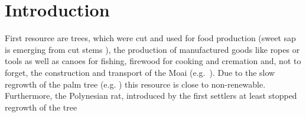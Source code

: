 
\section{Introduction}


First resource are trees, which were cut and used for food production (sweet sap is emerging from cut stems \citet{Mieth2015}), the production of manufactured goods like ropes or tools as well as canoes for fishing, firewood for cooking and cremation and, not to forget, the construction and transport of the Moai (e.g.\ \citet{Diamond2011}). Due to the slow regrowth of the palm tree (e.g. \citet{Brander1998}) this resource is close to non-renewable. Furthermore, the Polynesian rat, introduced by the first settlers at least stopped regrowth of the tree



